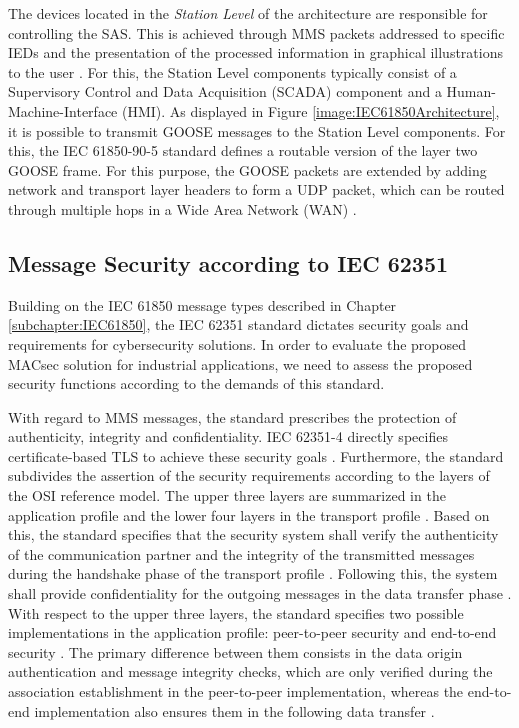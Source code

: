 \documentclass[conference, onecolumn, a4paper]{IEEEtran}
\begin{document}
\smallskip
The devices located in the \textit{Station Level} of the architecture are responsible for controlling the SAS. This is achieved through MMS packets addressed 
to specific IEDs and the presentation of the processed information in graphical illustrations to the user \cite{SGRWin_IEC61850Architecture:2021}. 
For this, the Station Level components typically consist of a Supervisory Control and Data Acquisition (SCADA) component and a Human-Machine-Interface 
(HMI). As displayed in Figure \ref{image:IEC61850Architecture}, it is possible to transmit GOOSE messages to the Station Level components. 
For this, the IEC 61850-90-5 standard \cite{IEC61850-90-5:2012} defines a routable version of the layer two GOOSE frame. For this purpose, the GOOSE 
packets are extended by adding network and transport layer headers to form a UDP packet, which can be routed through multiple hops in a Wide Area Network (WAN) 
\cite{routable_GOOSE_SV:2020}.

\subsection{Message Security according to IEC 62351}
\noindent Building on the IEC 61850 message types described in Chapter \ref{subchapter:IEC61850}, the IEC 62351 standard \cite{IEC62351:2024} dictates 
security goals and requirements for cybersecurity solutions. In order to evaluate the proposed MACsec solution for industrial applications, 
we need to assess the proposed security functions according to the demands of this standard.

\smallskip
With regard to MMS messages, the standard prescribes the protection of authenticity, integrity and confidentiality. IEC 62351-4 directly specifies 
certificate-based TLS to achieve these security goals \cite{SecureMMS:2020}. Furthermore, the standard subdivides the assertion of the security requirements 
according to the layers of the OSI reference model. The upper three layers are summarized in the application profile and the lower four layers in the 
transport profile \cite{SecureMMS:2020}. Based on this, the standard specifies that the security system shall verify the authenticity of the communication 
partner and the integrity of the transmitted messages during the handshake phase of the transport profile \cite{Review_IEC62351:2019}. Following this, 
the system shall provide confidentiality for the outgoing messages in the data transfer phase \cite{SecureMMS:2020}. With respect to the upper three 
layers, the standard specifies two possible implementations in the application profile: peer-to-peer security and end-to-end security 
\cite{Review_IEC62351:2019}. The primary difference between them consists in the data origin authentication and message integrity checks, which are only 
verified during the association establishment in the peer-to-peer implementation, whereas the end-to-end implementation also ensures them in the following 
data transfer \cite{Review_IEC62351:2019}.
\end{document}
